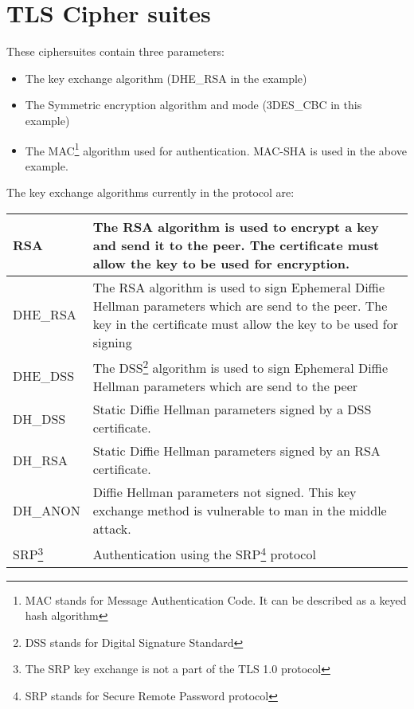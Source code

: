 \newpage
\section{TLS Cipher suites}
\par 
These ciphersuites contain three parameters:
\begin{itemize}
\item The key exchange algorithm (DHE\_RSA in the example)
\item The Symmetric encryption algorithm and mode (3DES\_CBC in this
example)
\item The MAC\footnote{MAC stands for Message Authentication Code. It can
be described as a keyed hash algorithm} algorithm used for authentication.
MAC-SHA is used in the above example.
\end{itemize}

\par The key exchange algorithms currently in the \tls protocol
are:

\par
\begin{tabular}{|l|p{9cm}|}

\hline
RSA & The RSA algorithm is used to encrypt a key and send it to the peer.
The certificate must allow the key to be used for encryption.
\\
\hline
DHE\_RSA & The RSA algorithm is used to sign Ephemeral Diffie Hellman
parameters which are send to the peer. The key in the certificate must allow
the key to be used for signing 
\\
\hline
DHE\_DSS & The DSS\footnote{DSS stands for Digital Signature Standard} algorithm is used to sign Ephemeral Diffie Hellman
parameters which are send to the peer \\
\hline
DH\_DSS & Static Diffie Hellman parameters signed by a DSS certificate.
\\
\hline
DH\_RSA & Static Diffie Hellman parameters signed by an RSA certificate.
\\
\hline
DH\_ANON & Diffie Hellman parameters not signed. This key exchange method is
vulnerable to man in the middle attack.
\\
\hline
SRP\footnote{The SRP key exchange is not a part of the TLS 1.0 protocol} & Authentication using the SRP\footnote{SRP stands for Secure Remote Password protocol}
protocol
\\
\hline
\end{tabular}

